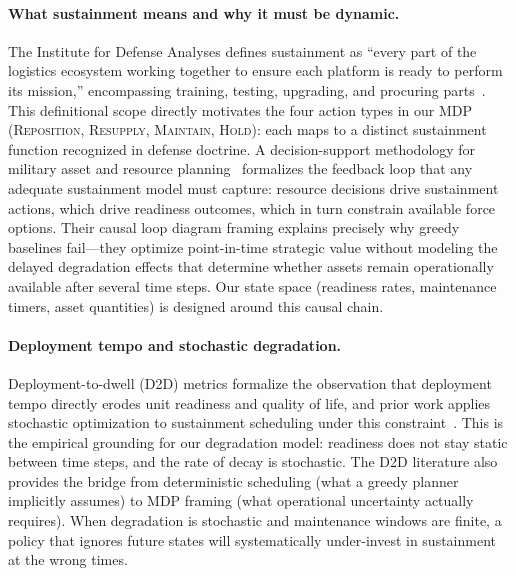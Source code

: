\documentclass[11pt]{article}
\begin{document}
\paragraph{What sustainment means and why it must be dynamic.}
The Institute for Defense Analyses defines sustainment as ``every part
of the logistics ecosystem working together to ensure each platform is
ready to perform its mission,'' encompassing training, testing, upgrading,
and procuring parts~\cite{ida_sustainment}. This definitional scope
directly motivates the four action types in our MDP
(\textsc{Reposition}, \textsc{Resupply}, \textsc{Maintain},
\textsc{Hold}): each maps to a distinct sustainment function recognized
in defense doctrine. A decision-support methodology for military asset
and resource planning~\cite{dsm_military_readiness} formalizes the
feedback loop that any adequate sustainment model must capture: resource
decisions drive sustainment actions, which drive readiness outcomes, which
in turn constrain available force options. Their causal loop diagram
framing explains precisely why greedy baselines fail---they optimize
point-in-time strategic value without modeling the delayed degradation
effects that determine whether assets remain operationally available after
several time steps. Our state space (readiness rates, maintenance timers,
asset quantities) is designed around this causal chain.

\paragraph{Deployment tempo and stochastic degradation.}
Deployment-to-dwell (D2D) metrics formalize the observation that
deployment tempo directly erodes unit readiness and quality of life, and
prior work applies stochastic optimization to sustainment scheduling
under this constraint~\cite{d2d_sustainment}. This is the empirical
grounding for our degradation model: readiness does not stay static
between time steps, and the rate of decay is stochastic. The D2D
literature also provides the bridge from deterministic scheduling (what
a greedy planner implicitly assumes) to MDP framing (what operational
uncertainty actually requires). When degradation is stochastic and
maintenance windows are finite, a policy that ignores future states
will systematically under-invest in sustainment at the wrong times.
\end{document}
